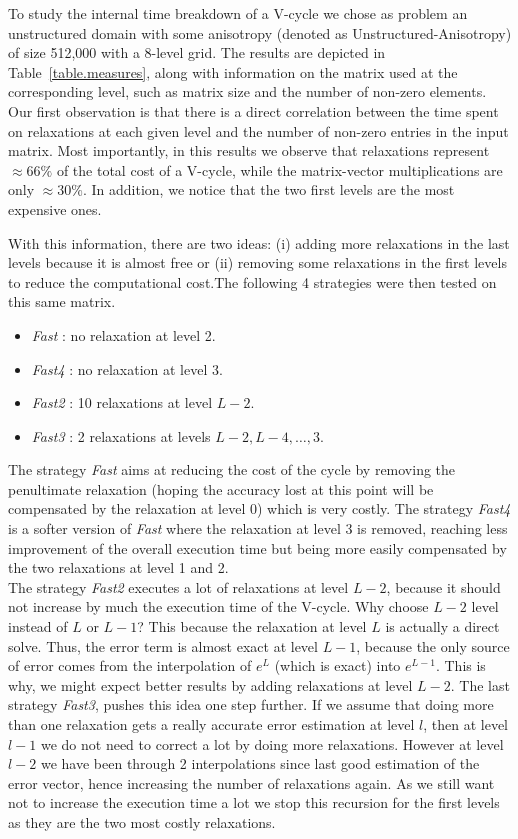 To study the internal time breakdown of a V-cycle we chose as problem an
unstructured domain with some anisotropy (denoted as Unstructured-Anisotropy)
of size 512,000 with a 8-level grid. The results are depicted in
Table~\ref{table.measures}, along with information on the matrix used at the
corresponding level, such as matrix size and the number of non-zero elements.
Our first observation is that there is a direct correlation between the time
spent on relaxations at each given level and the number of non-zero entries in
the input matrix. Most importantly, in this results we observe that relaxations
represent $\approx66\%$ of the total cost of a V-cycle, while the matrix-vector
multiplications are only $\approx30\%$. In addition, we notice that the two
first levels are the most expensive ones.

With this information, there are two ideas: (i) adding more relaxations in the
last levels because it is almost free or (ii) removing some relaxations in the
first levels to reduce the computational cost.The following 4 strategies were
then tested on this same matrix.

\begin{itemize}
    \item \emph{Fast} : no relaxation at level 2.
    \item \emph{Fast4} : no relaxation at level 3.
    \item \emph{Fast2} : 10 relaxations at level $L-2$.
    \item \emph{Fast3} : 2 relaxations at levels $L-2,L-4,\dots,3$.
\end{itemize}

The strategy \emph{Fast} aims at reducing the cost of the cycle by removing the
penultimate relaxation (hoping the accuracy lost at this point will be
compensated by the relaxation at level 0) which is very costly.  The strategy
\emph{Fast4} is a softer version of \emph{Fast} where the relaxation at level 3
is removed, reaching less improvement of the overall execution time but being
more easily compensated by the two relaxations at level 1 and 2.\\ The strategy
\emph{Fast2} executes a lot of relaxations at level $L-2$, because it should
not increase by much the execution time of the V-cycle. Why choose $L-2$ level
instead of $L$ or $L-1$?  This because the relaxation at level $L$ is actually
a direct solve. Thus, the error term is almost exact at level $L-1$, because
the only source of error comes from the interpolation of $e^L$ (which is exact)
into $e^{L-1}$. This is why, we might expect better results by adding
relaxations at level $L-2$.  The last strategy \emph{Fast3}, pushes this idea
one step further. If we assume that doing more than one relaxation gets a
really accurate error estimation at level $l$, then at level $l-1$ we do not
need to correct a lot by doing more relaxations. However at level $l-2$ we have
been through 2 interpolations since last good estimation of the error vector,
hence increasing the number of relaxations again.  As we still want not to
increase the execution time a lot we stop this recursion for the first levels
as they are the two most costly relaxations.

